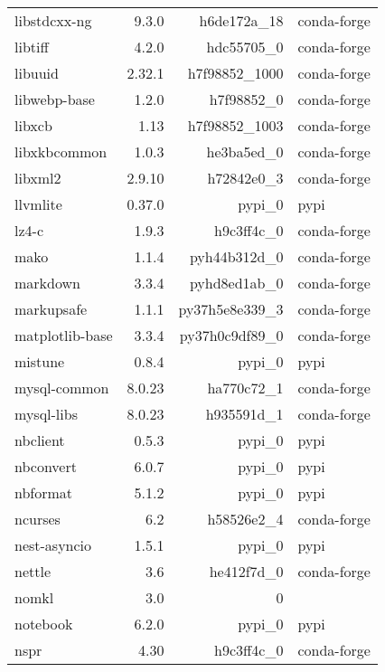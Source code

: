 \begin{table}
\begin{center}
\begin{tabular}{|l|r|r|l|}
			libstdcxx-ng &9.3.0 & h6de172a\_18 &conda-forge \\
			libtiff &4.2.0 & hdc55705\_0 &conda-forge \\
			libuuid &2.32.1 & h7f98852\_1000 &conda-forge \\
			libwebp-base &1.2.0 & h7f98852\_0 &conda-forge \\
			libxcb &1.13 & h7f98852\_1003 &conda-forge \\
			libxkbcommon &1.0.3 & he3ba5ed\_0 &conda-forge \\
			libxml2 &2.9.10 & h72842e0\_3 &conda-forge \\
			llvmlite &0.37.0 & pypi\_0 &pypi \\
			lz4-c &1.9.3 & h9c3ff4c\_0 &conda-forge \\
			mako &1.1.4 & pyh44b312d\_0 &conda-forge \\
			markdown &3.3.4 & pyhd8ed1ab\_0 &conda-forge \\
			markupsafe &1.1.1 & py37h5e8e339\_3 &conda-forge \\
			matplotlib-base &3.3.4 & py37h0c9df89\_0 &conda-forge \\
			mistune &0.8.4 & pypi\_0 &pypi \\
			mysql-common &8.0.23 & ha770c72\_1 &conda-forge \\
			mysql-libs &8.0.23 & h935591d\_1 &conda-forge \\
			nbclient &0.5.3 & pypi\_0 &pypi \\
			nbconvert &6.0.7 & pypi\_0 &pypi \\
			nbformat &5.1.2 & pypi\_0 &pypi \\
			ncurses &6.2 & h58526e2\_4 &conda-forge \\
			nest-asyncio &1.5.1 & pypi\_0 &pypi \\
			nettle &3.6 & he412f7d\_0 &conda-forge \\
			nomkl &3.0 & 0 & \\
			notebook &6.2.0 & pypi\_0 &pypi \\
			nspr &4.30 & h9c3ff4c\_0 &conda-forge \\
		\end{tabular}
	\end{center}
\end{table}		



